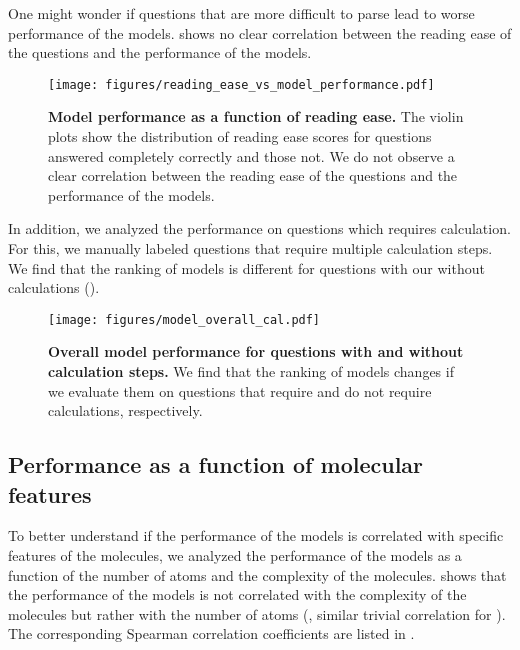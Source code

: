 One might wonder if questions that are more difficult to parse lead to worse performance of the models.
 shows no clear correlation between the reading ease of the questions and the performance of the models.

\begin{figure}
    \centering
    \hspace*{-1cm}
    \texttt{[image: figures/reading\_ease\_vs\_model\_performance.pdf]}
    \caption{\textbf{Model performance as a function of reading ease.} The violin plots show the distribution of reading ease scores for questions answered completely correctly and those not. We do not observe a clear correlation between the reading ease of the questions and the performance of the models. }
    \label{fig:reading_ease_vs_model_performance}
\end{figure}

In addition, we analyzed the performance on questions which requires calculation. For this, we manually labeled questions that require multiple calculation steps. 
We find that the ranking of models is different for questions with our without calculations (). 

\begin{figure}
    \centering
    \texttt{[image: figures/model\_overall\_cal.pdf]}
    \caption{\textbf{Overall model performance for questions with and without calculation steps.} We find that the ranking of models changes if we evaluate them on questions that require and do not require calculations, respectively.}
    \label{fig:requires_cal}
\end{figure}

\clearpage

\subsection{Performance as a function of molecular features}
To better understand if the performance of the models is correlated with specific features of the molecules, we analyzed the performance of the models as a function of the number of atoms and the complexity of the molecules.
 shows that the performance of the models is not correlated with the complexity of the molecules but rather with the number of atoms (, similar trivial correlation for ). 
The corresponding Spearman correlation coefficients are listed in .

